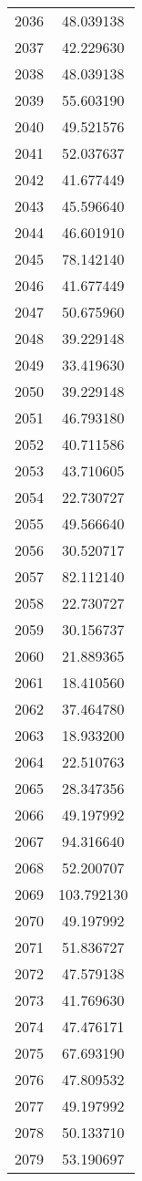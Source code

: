 \documentclass[12pt]{article}
\begin{document}
\begin{longtable}{@{}cc@{}}
2036 & 48.039138 \\
2037 & 42.229630 \\
2038 & 48.039138 \\
2039 & 55.603190 \\
2040 & 49.521576 \\
2041 & 52.037637 \\
2042 & 41.677449 \\
2043 & 45.596640 \\
2044 & 46.601910 \\
2045 & 78.142140 \\
2046 & 41.677449 \\
2047 & 50.675960 \\
2048 & 39.229148 \\
2049 & 33.419630 \\
2050 & 39.229148 \\
2051 & 46.793180 \\
2052 & 40.711586 \\
2053 & 43.710605 \\
2054 & 22.730727 \\
2055 & 49.566640 \\
2056 & 30.520717 \\
2057 & 82.112140 \\
2058 & 22.730727 \\
2059 & 30.156737 \\
2060 & 21.889365 \\
2061 & 18.410560 \\
2062 & 37.464780 \\
2063 & 18.933200 \\
2064 & 22.510763 \\
2065 & 28.347356 \\
2066 & 49.197992 \\
2067 & 94.316640 \\
2068 & 52.200707 \\
2069 & 103.792130 \\
2070 & 49.197992 \\
2071 & 51.836727 \\
2072 & 47.579138 \\
2073 & 41.769630 \\
2074 & 47.476171 \\
2075 & 67.693190 \\
2076 & 47.809532 \\
2077 & 49.197992 \\
2078 & 50.133710 \\
2079 & 53.190697 \\

\end{longtable}
\end{document}
